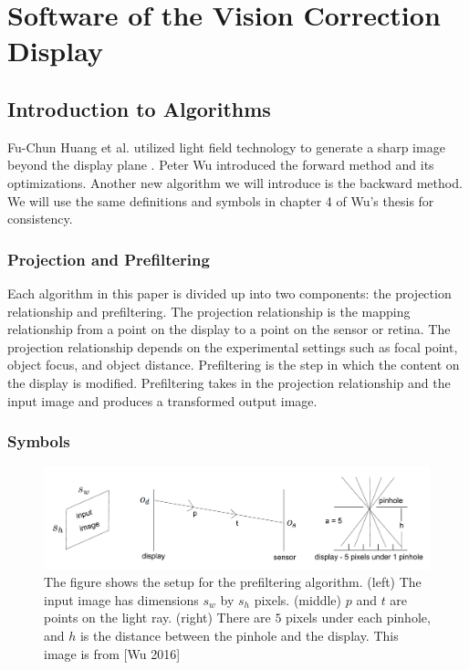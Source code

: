 \chapter{Software of the Vision Correction Display}

\section{Introduction to Algorithms}

Fu-Chun Huang et al. utilized light field technology to generate a sharp image beyond the display plane \cite{Huang:EECS-2013-206}. Peter Wu introduced the forward method and its optimizations. Another new algorithm we will introduce is the backward method. We will use the same definitions and symbols in chapter 4 of Wu's thesis for consistency.

\subsection{Projection and Prefiltering}

Each algorithm in this paper is divided up into two components: the projection relationship and prefiltering. The projection relationship is the mapping relationship from a point on the display to a point on the sensor or retina. The projection relationship depends on the experimental settings such as focal point, object focus, and object distance. Prefiltering is the step in which the content on the display is modified. Prefiltering takes in the projection relationship and the input image and produces a transformed output image.

\subsection{Symbols}

\begin{figure}[ht]
  \centering
  \includegraphics[width=5.0in]{chapters/chapter4/images/Prefilter.png}
  \caption{The figure shows the setup for the prefiltering algorithm. (left) The input image has dimensions $s_w$ by $s_h$ pixels. (middle) $p$ and $t$ are points on the light ray. (right) There are $5$ pixels under each pinhole, and $h$ is the distance between the pinhole and the display. This image is from [Wu 2016]}
  \label{fig:fr}
\end{figure}


